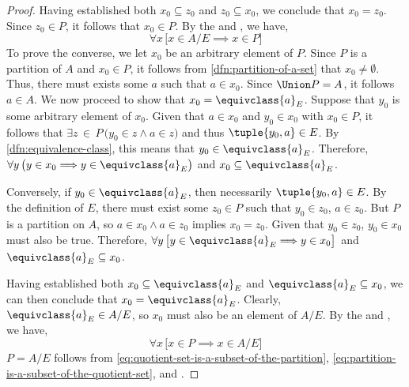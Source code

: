 \begin{proof}
    \vspace{0.3cm}
    \noindent
    Having established both \( x_{0} \subseteq z_{0} \) and \( z_{0} \subseteq x_{0} \), we conclude that \( x_{0} = z_{0} \).
    Since \( z_{0} \in P \), it follows that \( x_{0} \in P \). By the  and , we have,
    \begin{equation}
        \label{eq:quotient-set-is-a-subset-of-the-partition}
        \forall x \, \big[ x \in A / E \implies x \in P \big]
    \end{equation}
    To prove the converse, we let \( x_{0} \) be an arbitrary element of \( P \). Since \( P \) is a partition of \( A \)
    and \( x_{0} \in P \), it follows from \cref{dfn:partition-of-a-set} that \( x_{0} \neq \emptyset \). Thus, there must
    exists some \( a \) such that \( a \in x_{0} \). Since \( \Union P = A \), it follows \( a \in A \). We now proceed
    to show that \( x_{0} = \equivclass{a}_{E} \). Suppose that \( y_{0} \) is some arbitrary element of \( x_{0} \). Given
    that \( a \in x_{0} \) and \( y_{0} \in x_{0} \) with \( x_{0} \in P \),
    it follows that \( \exists z\,{\in}\,P \, \big( y_{0} \in z \land a \in z \big) \) and thus \( \tuple{y_{0},a} \in E \).
    By \cref{dfn:equivalence-class}, this means that \( y_{0} \in \equivclass{a}_{E} \).
    Therefore, \( \forall y \, \big( y \in x_{0} {\implies} y \in \equivclass{a}_{E} \big) \) and \( x_{0} \subseteq \equivclass{a}_{E} \).

    \vspace{0.3cm}
    \noindent
    Conversely, if \( y_{0} \in \equivclass{a}_{E} \), then necessarily \( \tuple{y_{0},a} \in E \). By the definition of \( E \), there must exist
    some \( z_{0} \in P \) such that \( y_{0} \in z_{0} \), \( a \in z_{0} \). But \( P \) is a partition on \( A \), so \( a \in x_{0} \land a \in z_{0} \)
    implies \( x_{0} = z_{0} \). Given that \( y_{0} \in z_{0} \), \( y_{0} \in x_{0} \) must also be true.
    Therefore, \( \forall y \, \big[ y \in \equivclass{a}_{E} {\implies} y \in x_{0} \big] \) and \( \equivclass{a}_{E} \subseteq x_{0} \).

    \vspace{0.3cm}
    \noindent
    Having established both \( x_{0} \subseteq \equivclass{a}_{E} \) and \( \equivclass{a}_{E} \subseteq x_{0} \), we can then conclude that
    \( x_{0} = \equivclass{a}_{E} \). Clearly, \( \equivclass{a}_{E} \in A / E \), so \( x_{0} \) must also be an element of \( A / E \). By the
     and , we have,
    \begin{equation}
        \label{eq:partition-is-a-subset-of-the-quotient-set}
        \forall x \, \Big[ x \in P \implies x \in A / E \Big]
    \end{equation}
    \( P = A / E \) follows from \eqref{eq:quotient-set-is-a-subset-of-the-partition}, \eqref{eq:partition-is-a-subset-of-the-quotient-set},
    and .
\end{proof}


